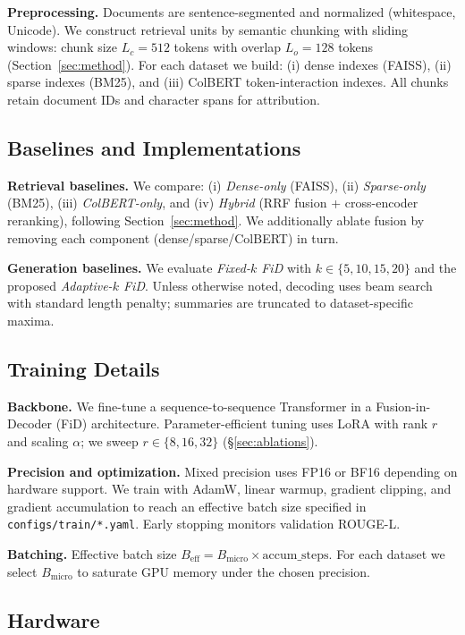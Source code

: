 \documentclass[11pt,a4paper]{article}
\begin{document}
\textbf{Preprocessing.} Documents are sentence-segmented and normalized (whitespace, Unicode). We construct retrieval units by semantic chunking with sliding windows: chunk size $L_c=512$ tokens with overlap $L_o=128$ tokens (Section~\ref{sec:method}). For each dataset we build: (i) dense indexes (FAISS), (ii) sparse indexes (BM25), and (iii) ColBERT token-interaction indexes. All chunks retain document IDs and character spans for attribution.

\subsection{Baselines and Implementations}

\textbf{Retrieval baselines.} We compare: (i) \emph{Dense-only} (FAISS), (ii) \emph{Sparse-only} (BM25), (iii) \emph{ColBERT-only}, and (iv) \emph{Hybrid} (RRF fusion + cross-encoder reranking), following Section~\ref{sec:method}. We additionally ablate fusion by removing each component (dense/sparse/ColBERT) in turn.

\textbf{Generation baselines.} We evaluate \emph{Fixed-$k$ FiD} with $k\in\{5,10,15,20\}$ and the proposed \emph{Adaptive-$k$ FiD}. Unless otherwise noted, decoding uses beam search with standard length penalty; summaries are truncated to dataset-specific maxima.

\subsection{Training Details}

\textbf{Backbone.} We fine-tune a sequence-to-sequence Transformer in a Fusion-in-Decoder (FiD) architecture. Parameter-efficient tuning uses LoRA \cite{hu2021lora} with rank $r$ and scaling $\alpha$; we sweep $r\in\{8,16,32\}$ (\S\ref{sec:ablations}).

\textbf{Precision and optimization.} Mixed precision uses FP16 or BF16 depending on hardware support. We train with AdamW, linear warmup, gradient clipping, and gradient accumulation to reach an effective batch size specified in \texttt{configs/train/*.yaml}. Early stopping monitors validation ROUGE-L.

\textbf{Batching.} Effective batch size $B_{\text{eff}}=B_{\text{micro}}\times \text{accum\_steps}$. For each dataset we select $B_{\text{micro}}$ to saturate GPU memory under the chosen precision.

\subsection{Hardware}
\end{document}
